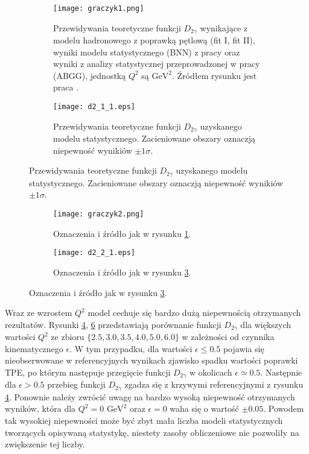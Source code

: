 \documentclass[11pt]{book}
\theoremstyle{definition}
\begin{document}
\begin{figure}
	\centering
	\begin{subfigure}[b]{1.\textwidth}
		\texttt{[image: graczyk1.png]}
		\caption{Przewidywania teoretyczne funkcji $D_{2 \gamma}$ wynikające z modelu hadronowego z poprawką pętlową (fit I, fit II), wyniki modelu statystycznego (BNN) z pracy \cite{2013PhRvC..88f5205G} oraz wyniki z analizy statystycznej przeprowadzonej w pracy \cite{2009PhRvC..79f5204A} (ABGG),  jednostką $Q^2$ są  $\text{GeV}^2$. Źródłem rysunku jest praca \cite{2013PhRvC..88f5205G}.}
		\label{fig:c2_gra1} 
	\end{subfigure}

	\begin{subfigure}[b]{1.\textwidth}
		\texttt{[image: d2\_1\_1.eps]}
		\caption{Przewidywania teoretyczne funkcji $D_{2 \gamma}$ uzyskanego modelu statystycznego. Zacieniowane obszary oznaczją niepewność wynikiów $\pm 1 \sigma$.}
		\label{fig:c2_raf1}
	\end{subfigure}

\end{figure}


\begin{figure}
	\centering
	\begin{subfigure}[b]{1.\textwidth}
		\texttt{[image: graczyk2.png]}
		\caption{Oznaczenia i źródło jak w rysunku \ref{fig:c2_gra1}.}
		\label{fig:c2_gra2} 
	\end{subfigure}
	
	\begin{subfigure}[b]{1.\textwidth}
		\texttt{[image: d2\_2\_1.eps]}
		\caption{Oznaczenia i źródło jak w rysunku \ref{fig:c2_raf1}.}
		\label{fig:c2_raf2}
	\end{subfigure}

\end{figure}


Wraz ze wzrostem $Q^2$ model cechuje się bardzo dużą niepewnością otrzymanych rezultatów. Rysunki \ref{fig:c2_gra2}, \ref{fig:c2_raf2} przedstawiają porównanie funkcji $D_{2\gamma}$ dla większych wartości $Q^2$ ze zbioru $\{2.5, 3.0, 3.5,4.0,5.0,6.0\}$ w zależności od czynnika kinematycznego $\epsilon$. W tym przypadku, dla wartości $\epsilon \leq 0.5$ pojawia się nieobserwowane w referencyjnych wynikach zjawisko spadku wartości poprawki TPE, po którym następuje przegięcie funkcji $D_{2\gamma}$ w okolicach $\epsilon \simeq 0.5$. Następnie dla $\epsilon > 0.5$ przebieg funkcji $D_{2\gamma}$ zgadza się z krzywymi referencyjnymi z rysunku \ref{fig:c2_gra2}. Ponownie należy zwrócić uwagę na bardzo wysoką niepewność otrzymanych wyników, która dla $Q^2 = 0$ $\text{GeV}^2$ oraz $\epsilon=0$ waha się o wartość $\pm 0.05$. Powodem tak wysokiej niepewności może być zbyt mała liczba modeli statystycznych tworzących opisywaną statystykę, niestety zasoby obliczeniowe nie pozwoliły na zwiększenie tej liczby.
\end{document}
